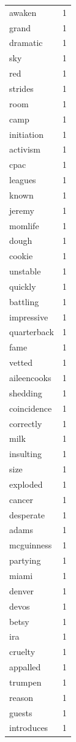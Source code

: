 \begin{tabular}{lr}
awaken & 1 \\
grand & 1 \\
dramatic & 1 \\
sky & 1 \\
red & 1 \\
strides & 1 \\
room & 1 \\
camp & 1 \\
initiation & 1 \\
activism & 1 \\
cpac & 1 \\
leagues & 1 \\
known & 1 \\
jeremy & 1 \\
momlife & 1 \\
dough & 1 \\
cookie & 1 \\
unstable & 1 \\
quickly & 1 \\
battling & 1 \\
impressive & 1 \\
quarterback & 1 \\
fame & 1 \\
vetted & 1 \\
aileencooks & 1 \\
shedding & 1 \\
coincidence & 1 \\
correctly & 1 \\
milk & 1 \\
insulting & 1 \\
size & 1 \\
exploded & 1 \\
cancer & 1 \\
desperate & 1 \\
adams & 1 \\
mcguinness & 1 \\
partying & 1 \\
miami & 1 \\
denver & 1 \\
devos & 1 \\
betsy & 1 \\
ira & 1 \\
cruelty & 1 \\
appalled & 1 \\
trumpen & 1 \\
reason & 1 \\
guests & 1 \\
introduces & 1 \\

\end{tabular}
